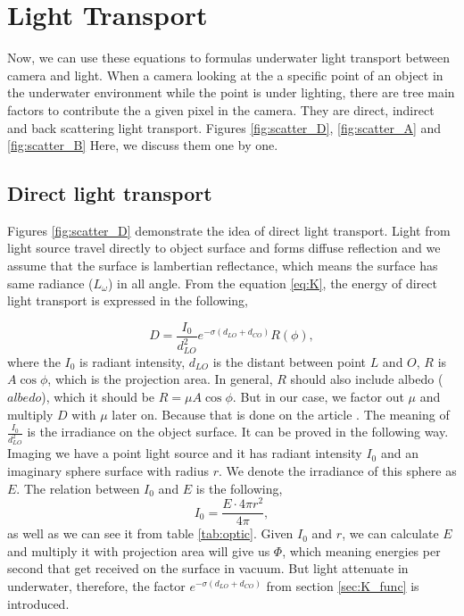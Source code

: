 \documentclass{article}
\begin{document}
\section{Light Transport}
Now, we can use these equations to formulas underwater light transport between camera and light. When a camera looking at the a specific point of an object in the underwater environment while the point is under lighting, there are tree main factors to contribute the a given pixel in the camera. They are direct, indirect and back scattering light transport. Figures \ref{fig:scatter_D}, \ref{fig:scatter_A} and \ref{fig:scatter_B} Here, we discuss them one by one.

\subsection{Direct light transport}
Figures \ref{fig:scatter_D} demonstrate the idea of direct light transport. Light from light source travel directly to object surface and forms diffuse reflection and we assume that the surface is lambertian reflectance, which means the surface has same radiance ($L_\omega$) in all angle. From the equation \ref{eq:K}, the energy of direct light transport is expressed in the following,

\begin{equation}
    D = \frac{I_0}{d_{LO}^2}e^{-\sigma(d_{LO}+d_{CO})}R(\phi),
    \label{eq:D}
\end{equation}
where the $I_0$ is radiant intensity, $d_{LO}$ is the distant between point $L$ and $O$, $R$ is $A \cos\phi$, which is the projection area. In general, $R$ should also include albedo ($albedo$), which it should be $R=\mu A\cos\phi$. But in our case, we factor out $\mu$ and multiply $D$ with $\mu$ later on. Because that is done on the article \cite{gupta2008controlling}. The meaning of $\frac{I_0}{d_{LO}^2}$ is the irradiance on the object surface. It can be proved in the following way. Imaging we have a point light source and it has radiant intensity $I_0$ and an imaginary sphere surface with radius $r$. We denote the irradiance of this sphere as $E$. The relation between $I_0$ and $E$ is the following,
\begin{equation}
    I_0 = \frac{E\cdot4\pi r^2}{4\pi},
\end{equation}
as well as we can see it from table \ref{tab:optic}. Given $I_0$ and $r$, we can calculate $E$ and multiply it with projection area will give us $\Phi$, which meaning energies per second that get received on the surface in vacuum. But light attenuate in underwater, therefore, the factor $e^{-\sigma(d_{LO}+d_{CO})}$ from section \ref{sec:K_func} is introduced.
\end{document}
